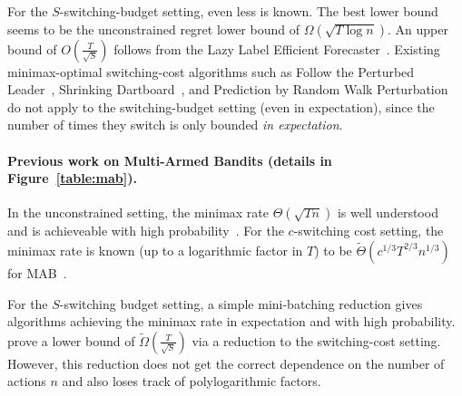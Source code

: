 \documentclass[final,12pt]{colt2018}
\DeclareMathOperator{\sd}{\textsc{SD}}
\DeclareMathOperator{\mfpl}{\textsc{FPL}^*}
\DeclareMathOperator{\pr}{\textsc{PRW}}
\begin{document}
\par For the $S$-switching-budget setting, even less is known. The best lower bound seems to be the unconstrained regret lower bound of $\Omega(\sqrt{T \log n})$. An upper bound of $O(\tfrac{T}{\sqrt{S}})$ follows from the Lazy Label Efficient Forecaster~\citep{lazy-label-efficient-forecaster}. Existing minimax-optimal switching-cost algorithms such as Follow the Perturbed Leader~\citep{KalVem}, Shrinking Dartboard~\citep{Dartboard}, and Prediction by Random Walk Perturbation~\citep{DevLugNeu15} do not apply to the switching-budget setting (even in expectation), since the number of times they switch is only bounded \textit{in expectation}.

\paragraph*{Previous work on Multi-Armed Bandits (details in Figure~\ref{table:mab}).} In the unconstrained setting, the minimax rate $\Theta(\sqrt{Tn})$ is well understood~\citep{Auer02,AudBub10} and is achieveable with high probability~\citep{AudBub10, Bubecksurvey}. For the $c$-switching cost setting, the minimax rate is known (up to a logarithmic factor in $T$) to be $\tilde{\Theta}(c^{1/3}T^{2/3}n^{1/3})$ for MAB~\citep{AroDekTew12,DekDinKorPer}.

\par For the $S$-switching budget setting, a simple mini-batching reduction gives algorithms achieving the minimax rate in expectation and with high probability. \citet{DekDinKorPer}  prove a lower bound of $\tilde{\Omega}(\tfrac{T}{\sqrt{S}})$ via a reduction to the switching-cost setting. However, this reduction does not get the correct dependence on the number of actions $n$ and also loses track of polylogarithmic factors.
\end{document}
